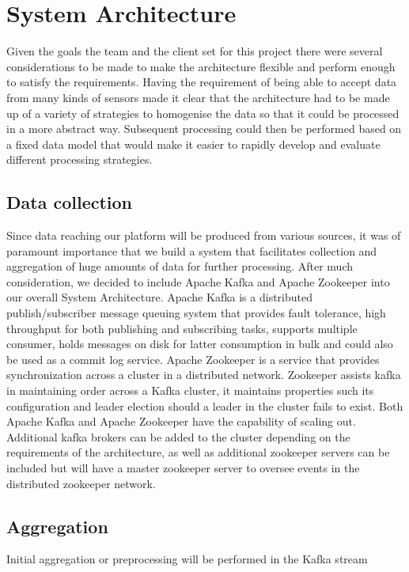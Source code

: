 \documentclass[prodmode,acmtosem]{acmsmall} %
\begin{document}
\section{System Architecture}
\label{architecture}
Given the goals the team and the client set for this project there were several considerations to be made to make the architecture flexible and perform enough to satisfy the requirements. Having the requirement of being able to accept data from many kinds of sensors made it clear that the architecture had to be made up of a variety of strategies to homogenise the data so that it could be processed in a more abstract way. Subsequent processing could then be performed based on a fixed data model that would make it easier to rapidly develop and evaluate different processing strategies.

\subsection{Data collection}
Since data reaching our platform will be produced from various sources, it was of paramount importance that we build a system that facilitates collection and aggregation of huge amounts of data for further processing. After much consideration, we decided to include Apache Kafka and Apache Zookeeper into our overall System Architecture. Apache Kafka is a distributed publish/subscriber message queuing system that provides fault tolerance, high throughput for both publishing and subscribing tasks, supports multiple consumer, holds messages on disk for latter consumption in bulk and could also be used as a commit log service. Apache Zookeeper is a service that provides synchronization across a cluster in a distributed network. Zookeeper assists kafka in maintaining order across a Kafka cluster, it maintains properties such its configuration and leader election should a leader in the cluster fails to exist. Both Apache Kafka and Apache Zookeeper have the capability of scaling out. Additional kafka brokers can be added to the cluster depending on the requirements of the architecture, as well as additional zookeeper servers can be included but will have a master zookeeper server to oversee events in the distributed zookeeper network.


\subsection{Aggregation} 
Initial aggregation or preprocessing will be performed in the Kafka stream
\end{document}
